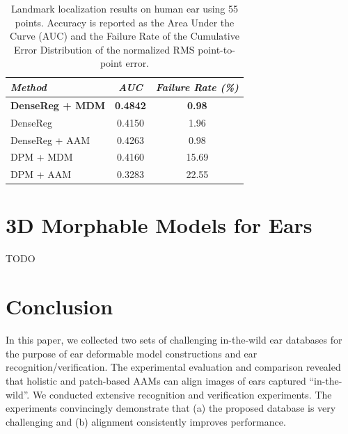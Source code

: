 \begin{table}
\centering
\begin{tabular}{|l|c|c|}
\hline
\emph{Method} & \emph{AUC} & \emph{Failure Rate (\%)}\\
\hline\hline
\textbf{DenseReg + MDM} & \textbf{0.4842} & \textbf{0.98} \\
DenseReg       &  0.4150 &   1.96 \\
DenseReg + AAM &  0.4263 &  0.98 \\
DPM + MDM      &  0.4160 &  15.69 \\
DPM + AAM      &  0.3283 &  22.55 \\
\hline
\end{tabular}
\caption{Landmark localization results on human ear using 55 points. Accuracy is reported as the Area Under the Curve (AUC) and the Failure Rate of the Cumulative Error Distribution of the normalized RMS point-to-point error.}
\label{tab:ears}
\end{table}



\section{3D Morphable Models for Ears}
TODO


\section{Conclusion}
In this paper, we collected two sets of challenging in-the-wild ear databases for the purpose of ear deformable model constructions and ear recognition/verification. The experimental evaluation and comparison revealed that holistic and patch-based AAMs can align images of ears captured ``in-the-wild''. We conducted extensive recognition and verification experiments. The experiments convincingly  demonstrate that (a) the proposed database is very challenging and (b) alignment consistently improves performance.